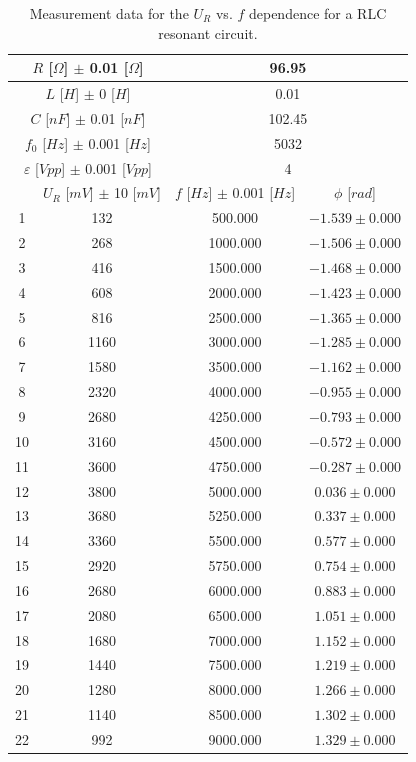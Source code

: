 \documentclass{article}
\begin{document}
\begin{table}[H]
\centering
\begin{tabular}{|c|c|c|c|}
\hline
\multicolumn{2}{|c|}{$R$ [$\Omega$] $\pm$ 0.01 [$\Omega$]}	&	\multicolumn{2}{|c|}{96.95}	\\
\hline
\multicolumn{2}{|c|}{$L$ [$H$] $\pm$ 0 [$H$]}	&	\multicolumn{2}{|c|}{0.01}	\\
\hline
\multicolumn{2}{|c|}{$C$ [$nF$] $\pm$ 0.01 [$nF$]}	&	\multicolumn{2}{|c|}{102.45}	\\
\hline
\multicolumn{2}{|c|}{$f_0$ [$Hz$] $\pm$ 0.001 [$Hz$]}	&	\multicolumn{2}{|c|}{5032}	\\
\hline
\multicolumn{2}{|c|}{$\varepsilon$ [$Vpp$] $\pm$ 0.001 [$Vpp$]}	&	\multicolumn{2}{|c|}{4}	\\
\hline
& $U_R$ [$mV$] $\pm$ 10 [$mV$] & $f$ [$Hz$] $\pm$ 0.001 [$Hz$] & $\phi$ [$rad$]\\
\hline
1	&	132	&	500.000	&	$-1.539\pm0.000$	\\
\hline
2	&	268	&	1000.000	&	$-1.506\pm0.000$	\\
\hline
3	&	416	&	1500.000	&	$-1.468\pm0.000$	\\
\hline
4	&	608	&	2000.000	&	$-1.423\pm0.000$	\\
\hline
5	&	816	&	2500.000	&	$-1.365\pm0.000$	\\
\hline
6	&	1160	&	3000.000	&	$-1.285\pm0.000$	\\
\hline
7	&	1580	&	3500.000	&	$-1.162\pm0.000$	\\
\hline
8	&	2320	&	4000.000	&	$-0.955\pm0.000$	\\
\hline
9	&	2680	&	4250.000	&	$-0.793\pm0.000$	\\
\hline
10	&	3160	&	4500.000	&	$-0.572\pm0.000$	\\
\hline
11	&	3600	&	4750.000	&	$-0.287\pm0.000$	\\
\hline
12	&	3800	&	5000.000	&	$0.036\pm0.000$	\\
\hline
13	&	3680	&	5250.000	&	$0.337\pm0.000$	\\
\hline
14	&	3360	&	5500.000	&	$0.577\pm0.000$	\\
\hline
15	&	2920	&	5750.000	&	$0.754\pm0.000$	\\
\hline
16	&	2680	&	6000.000	&	$0.883\pm0.000$	\\
\hline
17	&	2080	&	6500.000	&	$1.051\pm0.000$	\\
\hline
18	&	1680	&	7000.000	&	$1.152\pm0.000$	\\
\hline
19	&	1440	&	7500.000	&	$1.219\pm0.000$	\\
\hline
20	&	1280	&	8000.000	&	$1.266\pm0.000$	\\
\hline
21	&	1140	&	8500.000	&	$1.302\pm0.000$	\\
\hline
22	&	992	&	9000.000	&	$1.329\pm0.000$	\\
\hline
\end{tabular}
\caption{Measurement data for the $U_R$ vs. $f$ dependence for a RLC resonant circuit.}
\label{tab-4}
\end{table}
\end{document}
